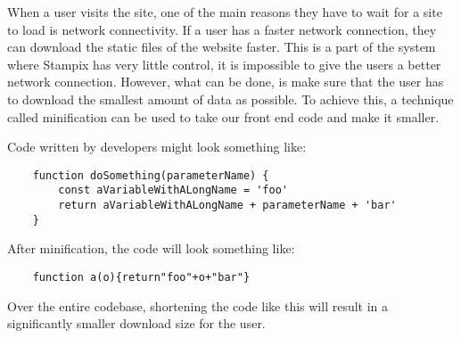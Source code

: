 When a user visits the site, one of the main reasons they have to wait for a site to load is network connectivity. 
If a user has a faster network connection, they can download the static files of the website faster.
This is a part of the system where Stampix has very little control, it is impossible to give the users a better network connection. 
However, what can be done, is make sure that the user has to download the smallest amount of data as possible. 
To achieve this, a technique called minification can be used to take our front end code and make it smaller.

Code written by developers might look something like:

\begin{verbatim}
    function doSomething(parameterName) {
        const aVariableWithALongName = 'foo'
        return aVariableWithALongName + parameterName + 'bar'
    }
\end{verbatim}

After minification, the code will look something like:

\begin{verbatim}
    function a(o){return"foo"+o+"bar"}
\end{verbatim}

Over the entire codebase, shortening the code like this will result in a significantly smaller download size for the user.
